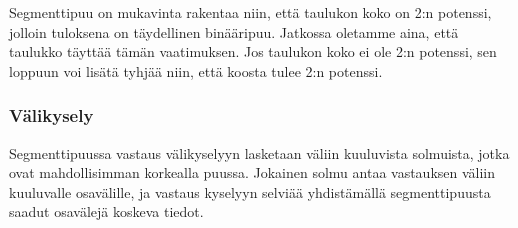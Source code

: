 Segmenttipuu on mukavinta rakentaa niin,
että taulukon koko on 2:n potenssi,
jolloin tuloksena on täydellinen binääripuu.
Jatkossa oletamme aina,
että taulukko täyttää tämän vaatimuksen.
Jos taulukon koko ei ole 2:n potenssi,
sen loppuun voi lisätä tyhjää niin,
että koosta tulee 2:n potenssi.

\subsubsection{Välikysely}

Segmenttipuussa vastaus välikyselyyn lasketaan
väliin kuuluvista solmuista,
jotka ovat mahdollisimman korkealla puussa.
Jokainen solmu antaa vastauksen väliin kuuluvalle osavälille,
ja vastaus kyselyyn selviää yhdistämällä
segmenttipuusta saadut osavälejä koskeva tiedot.

